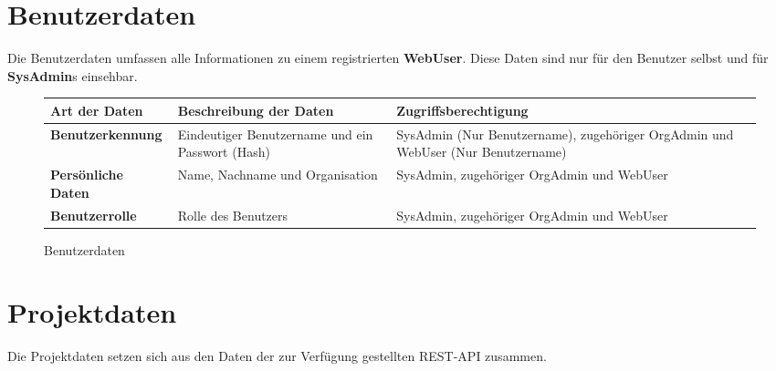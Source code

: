 \section{Benutzerdaten}

Die Benutzerdaten umfassen alle Informationen zu einem registrierten \textbf{WebUser}. Diese Daten sind nur f\"ur den Benutzer selbst und f\"ur \textbf{SysAdmin}s einsehbar.

\begin{figure}[h]
	\centering
	\begin{tabularx}{\textwidth}{| X || X | X |}
        \hline
		\textbf{Art der Daten} & \textbf{Beschreibung der Daten} & \textbf{Zugriffsberechtigung} \\ \hline \hline
		\textbf{Benutzerkennung} & Eindeutiger Benutzername und ein Passwort (Hash) & SysAdmin (Nur Benutzername), zugehöriger OrgAdmin und WebUser (Nur Benutzername) \\ \hline
		\textbf{Persönliche Daten} & Name, Nachname und Organisation & SysAdmin, zugehöriger OrgAdmin und WebUser \\ \hline
		\textbf{Benutzerrolle} & Rolle des Benutzers & SysAdmin, zugehöriger OrgAdmin und WebUser \\ \hline
	\end{tabularx}
	\caption{Benutzerdaten}
	\label{fig:Benutzerdaten}
\end{figure}

\newpage

\section{Projektdaten}

Die Projektdaten setzen sich aus den Daten der zur Verf\"ugung gestellten REST-API zusammen.

